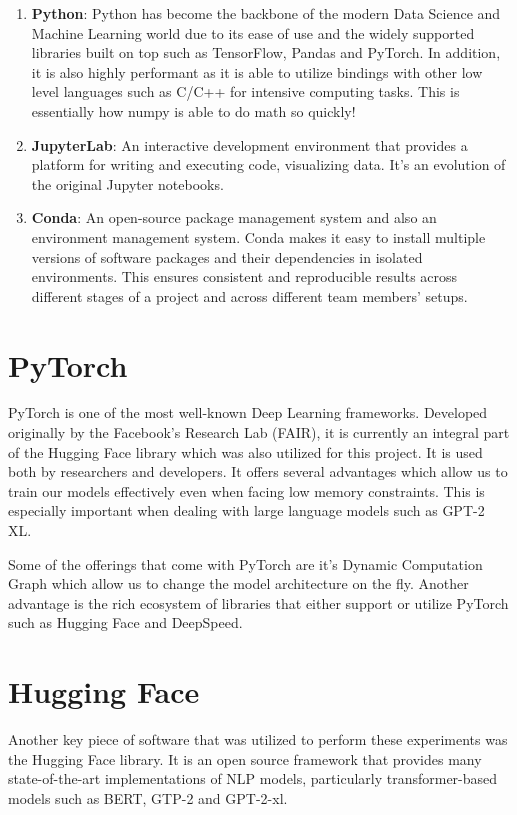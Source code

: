 \documentclass[\main/thesis.tex]{subfiles}
\begin{document}
\begin{enumerate}
    \item \textbf{Python}: Python has become the backbone of the modern Data Science and Machine Learning 
    world due to its ease of use and the widely supported libraries built on top such as TensorFlow, Pandas and PyTorch. 
    In addition, it is also highly performant as it is able to utilize bindings with other low level languages
    such as C/C++ for intensive computing tasks. This is essentially how numpy is able to do math so quickly! 
    
    \item \textbf{JupyterLab}: An interactive development environment that provides a platform for writing 
    and executing code, visualizing data. It's an evolution of the original Jupyter notebooks. 
    
    \item \textbf{Conda}: An open-source package management system and also an environment 
    management system. Conda makes it easy to install multiple versions of software packages 
    and their dependencies in isolated environments. This ensures consistent and reproducible 
    results across different stages of a project and across different team members' setups.
\end{enumerate}


\section{PyTorch}\label{sec:PyTorch}
PyTorch\cite{paszke_pytorch_2019} is one of the most well-known Deep Learning frameworks. Developed originally by the Facebook's Research Lab (FAIR), 
it is currently an integral part of the Hugging Face library which was also utilized for this project. It is used both by
researchers and developers. It offers several advantages which allow us to train our models effectively even when 
facing low memory constraints. This is especially important when dealing with large language models such as GPT-2 XL. 

Some of the offerings that come with PyTorch are it's Dynamic Computation Graph which allow us to change the model architecture 
on the fly. Another advantage is the rich ecosystem of libraries that either support or utilize PyTorch such as 
Hugging Face and DeepSpeed. 

\section{Hugging Face}\label{sec:Hugging Face}
Another key piece of software that was utilized to perform these experiments was 
the Hugging Face\cite{wolf_transformers_2020} library. It is 
an open source framework that provides many state-of-the-art implementations of NLP models, particularly transformer-based models such as BERT, GTP-2 
and GPT-2-xl.
\end{document}
